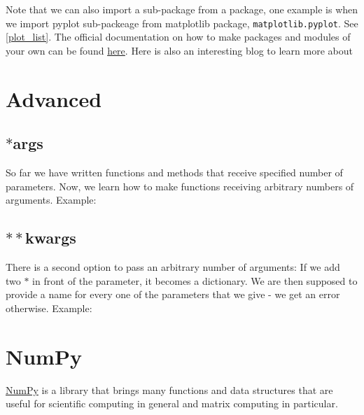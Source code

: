 \documentclass[10pt,a4paper]{article}
\begin{document}



Note that we can also import a sub-package from a package, one example is when we import pyplot sub-packeage from matplotlib package,  \texttt{matplotlib.pyplot}. See \ref{plot_list}.
The official documentation on how to make packages and modules of your own can be found \href{https://docs.python.org/3/tutorial/modules.html}{here}. Here is also an interesting blog to learn more about 





\section{Advanced}
\subsection{$\ast$args}
So far we have written functions and methods that receive specified number of parameters. Now, we learn how to make functions receiving arbitrary numbers of arguments. Example:

\subsection{$\ast\ast$kwargs}
There is a second option to pass an arbitrary number of arguments: If we add two $\ast$ in front of the parameter, it becomes a dictionary. We are then supposed to provide a name for every one of the parameters that we give - we get an error otherwise. Example:











\section{NumPy}
\href{https://numpy.org}{NumPy} is a library that brings many functions and data structures that are useful for scientific computing in general and matrix computing in particular. 
\end{document}

